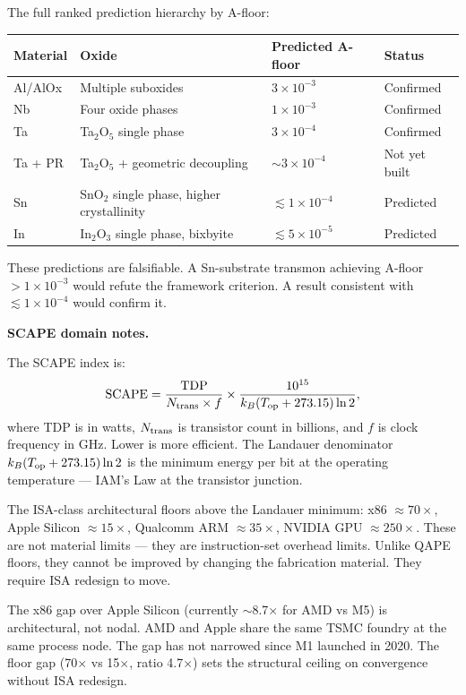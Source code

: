 \documentclass[12pt,a4paper]{article}
\begin{document}
The full ranked prediction hierarchy by A-floor:
\begin{center}
\begin{tabular}{llll}
\toprule
\textbf{Material} & \textbf{Oxide} & \textbf{Predicted A-floor} & \textbf{Status} \\
\midrule
Al/AlOx & Multiple suboxides & $3 \times 10^{-3}$ & Confirmed \\
Nb & Four oxide phases & $1 \times 10^{-3}$ & Confirmed \\
Ta & Ta$_2$O$_5$ single phase & $3 \times 10^{-4}$ & Confirmed \\
Ta + PR & Ta$_2$O$_5$ + geometric decoupling & ${\sim}3 \times 10^{-4}$ & Not yet built \\
Sn & SnO$_2$ single phase, higher crystallinity & ${\lesssim}1 \times 10^{-4}$ & Predicted \\
In & In$_2$O$_3$ single phase, bixbyite & ${\lesssim}5 \times 10^{-5}$ & Predicted \\
\bottomrule
\end{tabular}
\end{center}

These predictions are falsifiable. A Sn-substrate transmon achieving
A-floor $> 1 \times 10^{-3}$ would refute the framework criterion.
A result consistent with $\lesssim 1 \times 10^{-4}$ would confirm it.

\medskip
\textbf{SCAPE domain notes.}

The SCAPE index is:
\begin{equation}
{\rm SCAPE} = \frac{{\rm TDP}}{N_{\rm trans} \times f} \times
  \frac{10^{15}}{k_B (T_{\rm op} + 273.15) \ln 2},
\end{equation}
where TDP is in watts, $N_{\rm trans}$ is transistor count in billions,
and $f$ is clock frequency in GHz. Lower is more efficient. The Landauer
denominator $k_B(T_{\rm op}+273.15)\ln 2$ is the minimum energy per bit
at the operating temperature --- IAM's Law at the transistor junction.

The ISA-class architectural floors above the Landauer minimum:
x86 $\approx 70\times$, Apple Silicon $\approx 15\times$,
Qualcomm ARM $\approx 35\times$, NVIDIA GPU $\approx 250\times$.
These are not material limits --- they are instruction-set overhead limits.
Unlike QAPE floors, they cannot be improved by changing the fabrication
material. They require ISA redesign to move.

The x86 gap over Apple Silicon (currently $\sim$8.7$\times$ for AMD vs M5)
is architectural, not nodal. AMD and Apple share the same TSMC foundry at the
same process node. The gap has not narrowed since M1 launched in 2020. The
floor gap (70$\times$ vs 15$\times$, ratio 4.7$\times$) sets the structural
ceiling on convergence without ISA redesign.
\end{document}
